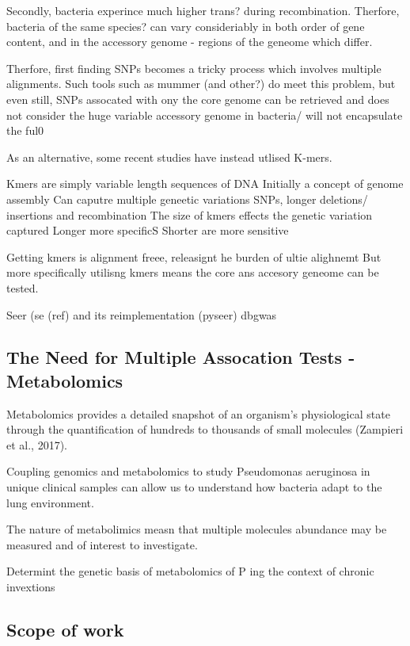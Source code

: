 \documentclass[]{DissertateUSU}
\begin{document}
Secondly, bacteria experince much higher trans? during recombination.
Therfore, bacteria of the same species? can vary consideriably in both
order of gene content, and in the accessory genome - regions of the
geneome which differ.

Therfore, first finding SNPs becomes a tricky process which involves
multiple alignments. Such tools such as mummer (and other?) do meet this
problem, but even still, SNPs assocated with ony the core genome can be
retrieved and does not consider the huge variable accessory genome in
bacteria/ will not encapsulate the ful0

As an alternative, some recent studies have instead utlised K-mers.

Kmers are simply variable length sequences of DNA Initially a concept of
genome assembly Can caputre multiple geneetic variations SNPs, longer
deletions/ insertions and recombination The size of kmers effects the
genetic variation captured Longer more specificS Shorter are more
sensitive

Getting kmers is alignment freee, releasignt he burden of ultie
alighnemt But more specifically utilisng kmers means the core ans
accesory geneome can be tested.

Seer (se (ref) and its reimplementation (pyseer) dbgwas

\hypertarget{the-need-for-multiple-assocation-tests---metabolomics}{%
\subsection{The Need for Multiple Assocation Tests -
Metabolomics}\label{the-need-for-multiple-assocation-tests---metabolomics}}

Metabolomics provides a detailed snapshot of an organism's physiological
state through the quantification of hundreds to thousands of small
molecules (Zampieri et al., 2017).

Coupling genomics and metabolomics to study Pseudomonas aeruginosa in
unique clinical samples can allow us to understand how bacteria adapt to
the lung environment.

The nature of metabolimics measn that multiple molecules abundance may
be measured and of interest to investigate.

Determint the genetic basis of metabolomics of P ing the context of
chronic invextions

\hypertarget{scope-of-work}{%
\subsection{Scope of work}\label{scope-of-work}}
\end{document}
